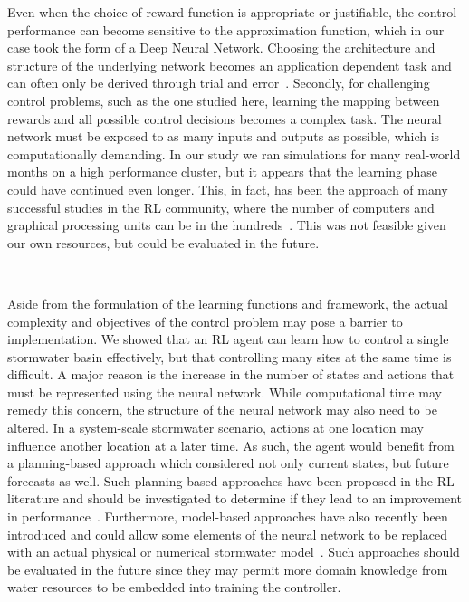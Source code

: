 Even when the choice of reward function is appropriate or justifiable, the control performance can become sensitive to the approximation function, which in our case took the form of a Deep Neural Network.
Choosing the architecture and structure of the underlying network becomes an application dependent task and can often only be derived through trial and error~\cite{Sutton98, henderson2017Deep}.
Secondly, for challenging control problems, such as the one studied here, learning the mapping between rewards and all possible control decisions becomes a complex task.
The neural network must be exposed to as many inputs and outputs as possible, which is computationally demanding.
In our study we ran simulations for many real-world months on a high performance cluster, but it appears that the learning phase could have continued even longer.
This, in fact, has been the approach of many successful studies in the RL community, where the number of computers and graphical processing units can be in the hundreds~\cite{espeholt2018impala, OpenAI_dota}.
This was not feasible given our own resources, but could be evaluated in the future.

\

Aside from the formulation of the learning functions and framework, the actual complexity and objectives of the control problem may pose a barrier to implementation.
We showed that an RL agent can learn how to control a single stormwater basin effectively, but that controlling many sites at the same time is difficult.
A major reason is the increase in the number of states and actions that must be represented using the neural network.
While computational time may remedy this concern, the structure of the neural network may also need to be altered.
In a system-scale stormwater scenario, actions at one location may influence another location at a later time.
As such, the agent would benefit from a planning-based approach which considered not only current states, but future forecasts as well.
Such planning-based approaches have been proposed in the RL literature and should be investigated to determine if they lead to an improvement in performance~\cite{clavera2018model,depeweg2016learning}.
Furthermore, model-based approaches have also recently been introduced and could allow some elements of the neural network to be replaced with an actual physical or numerical stormwater model~\cite{gu2016continuous}.
Such approaches should be evaluated in the future since they may permit more domain knowledge from water resources to be embedded into training the controller.

